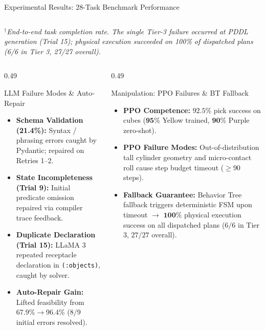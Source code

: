 \documentclass[10pt]{beamer}
\begin{document}
\begin{frame}{Experimental Results: 28-Task Benchmark Performance}
{\begin{tabular}{lccccc}
    \end{tabular}%
    }
    \vspace{0.02cm}
    {\fontsize{5.2pt}{6.0pt}\selectfont $^\dagger$\textit{End-to-end task completion rate. The single Tier-3 failure occurred at PDDL generation (Trial 15); physical execution succeeded on 100\% of dispatched plans (6/6 in Tier 3, 27/27 overall).}}\par
    \vspace{0.04cm}
    \begin{columns}[T,totalwidth=\textwidth]
        \begin{column}{0.49\textwidth}
            \begin{block}{LLM Failure Modes \& Auto-Repair}
                \begin{itemize}\scriptsize
                    \item \textbf{Schema Validation (21.4\%):} Syntax / phrasing errors caught by Pydantic; repaired on Retries 1--2.
                    \item \textbf{State Incompleteness (Trial 9):} Initial predicate omission repaired via compiler trace feedback.
                    \item \textbf{Duplicate Declaration (Trial 15):} LLaMA 3 repeated receptacle declaration in \texttt{(:objects)}, caught by solver.
                    \item \textbf{Auto-Repair Gain:} Lifted feasibility from $\mathbf{67.9\%} \to \mathbf{96.4\%}$ ($8/9$ initial errors resolved).
                \end{itemize}
            \end{block}
        \end{column}
        \begin{column}{0.49\textwidth}
            \begin{block}{Manipulation: PPO Failures \& BT Fallback}
                \begin{itemize}\scriptsize
                    \item \textbf{PPO Competence:} $\mathbf{92.5\%}$ pick success on cubes ($\mathbf{95\%}$ Yellow trained, $\mathbf{90\%}$ Purple zero-shot).
                    \item \textbf{PPO Failure Modes:} Out-of-distribution tall cylinder geometry and micro-contact roll cause step budget timeout ($\ge 90$ steps).
                    \item \textbf{Fallback Guarantee:} Behavior Tree fallback triggers deterministic FSM upon timeout $\to$ $\mathbf{100\%}$ physical execution success on all dispatched plans ($6/6$ in Tier 3, $27/27$ overall).
                \end{itemize}
            \end{block}
        \end{column}
    \end{columns}
\end{frame}
\end{document}
